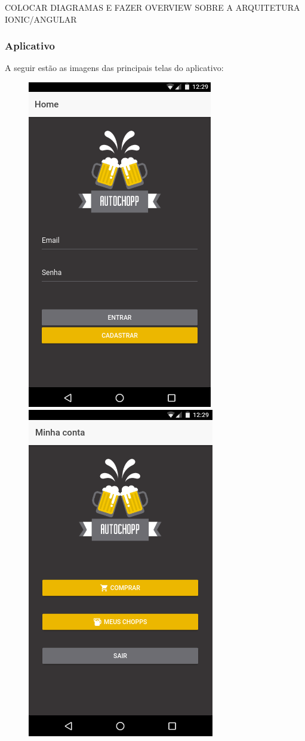 COLOCAR DIAGRAMAS E FAZER OVERVIEW SOBRE A ARQUITETURA IONIC/ANGULAR

\subsubsection{Aplicativo}

A seguir estão as imagens das principais telas do aplicativo:

\begin{figure}[!htb]
    \centering
    \includegraphics[scale= 0.3]{figuras/Aplicativo/home.png}        
    \includegraphics[scale= 0.3]{figuras/Aplicativo/home-loged.png}        

\end{figure}
